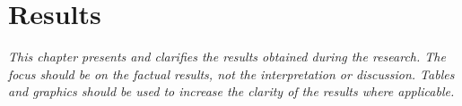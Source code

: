 \chapter{Results}
\emph{This chapter presents and clarifies the results obtained during the research. The focus
should be on the factual results, not the interpretation or discussion. Tables and graphics
should be used to increase the clarity of the results where applicable.}
